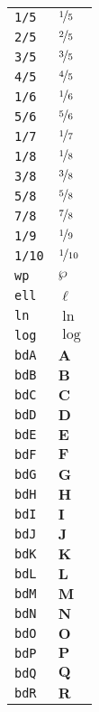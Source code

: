 \begin{longtable}{ll}
\texttt{1/5}&${}\nicefrac{1}{5} {}$\\
\texttt{2/5}&${}\nicefrac{2}{5} {}$\\
\texttt{3/5}&${}\nicefrac{3}{5} {}$\\
\texttt{4/5}&${}\nicefrac{4}{5} {}$\\
\texttt{1/6}&${}\nicefrac{1}{6} {}$\\
\texttt{5/6}&${}\nicefrac{5}{6} {}$\\
\texttt{1/7}&${}\nicefrac{1}{7} {}$\\
\texttt{1/8}&${}\nicefrac{1}{8} {}$\\
\texttt{3/8}&${}\nicefrac{3}{8} {}$\\
\texttt{5/8}&${}\nicefrac{5}{8} {}$\\
\texttt{7/8}&${}\nicefrac{7}{8} {}$\\
\texttt{1/9}&${}\nicefrac{1}{9} {}$\\
\texttt{1/10}&${}\nicefrac{1}{10} {}$\\
\texttt{wp}&${}\wp {}$\\
\texttt{ell}&${}\ell {}$\\
\texttt{ln}&${}\ln {}$\\
\texttt{log}&${}\log {}$\\
\texttt{bdA}&${}{\textbf{A}}{}$\\
\texttt{bdB}&${}{\textbf{B}}{}$\\
\texttt{bdC}&${}{\textbf{C}}{}$\\
\texttt{bdD}&${}{\textbf{D}}{}$\\
\texttt{bdE}&${}{\textbf{E}}{}$\\
\texttt{bdF}&${}{\textbf{F}}{}$\\
\texttt{bdG}&${}{\textbf{G}}{}$\\
\texttt{bdH}&${}{\textbf{H}}{}$\\
\texttt{bdI}&${}{\textbf{I}}{}$\\
\texttt{bdJ}&${}{\textbf{J}}{}$\\
\texttt{bdK}&${}{\textbf{K}}{}$\\
\texttt{bdL}&${}{\textbf{L}}{}$\\
\texttt{bdM}&${}{\textbf{M}}{}$\\
\texttt{bdN}&${}{\textbf{N}}{}$\\
\texttt{bdO}&${}{\textbf{O}}{}$\\
\texttt{bdP}&${}{\textbf{P}}{}$\\
\texttt{bdQ}&${}{\textbf{Q}}{}$\\
\texttt{bdR}&${}{\textbf{R}}{}$\\

\end{longtable}
